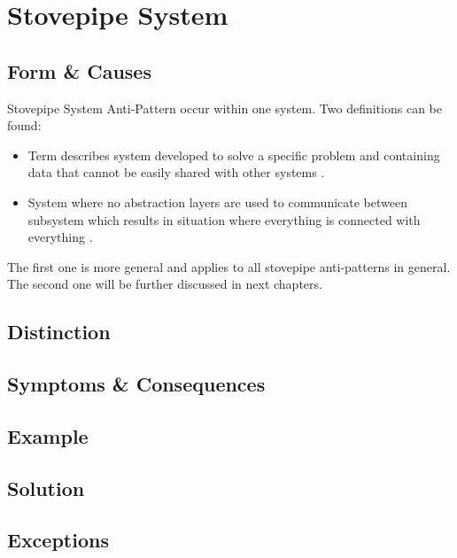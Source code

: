 \section{Stovepipe System}

\subsection{Form \& Causes}
Stovepipe System Anti-Pattern occur within one system. Two definitions can be found:
\begin{itemize}
\item Term describes system developed to solve a specific problem and containing data that cannot be easily shared with other systems \cite{c2com}.
\item System where no abstraction layers are used to communicate between subsystem which results in situation where everything is connected with everything \cite{Virtual}.
\end{itemize}
The first one is more general and applies to all stovepipe anti-patterns in general.
The second one will be further discussed in next chapters.



\subsection{Distinction}

\subsection{Symptoms \& Consequences}

\subsection{Example}

\subsection{Solution}

\subsection{Exceptions}